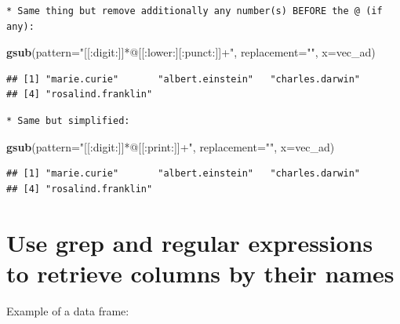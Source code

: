 \documentclass[]{book}
\newenvironment{Shaded}{\begin{snugshade}}{\end{snugshade}}
\newcommand{\DataTypeTok}[1]{\textcolor[rgb]{0.13,0.29,0.53}{#1}}
\newcommand{\KeywordTok}[1]{\textcolor[rgb]{0.13,0.29,0.53}{\textbf{#1}}}
\newcommand{\NormalTok}[1]{#1}
\newcommand{\StringTok}[1]{\textcolor[rgb]{0.31,0.60,0.02}{#1}}
\begin{document}
\begin{verbatim}
* Same thing but remove additionally any number(s) BEFORE the @ (if any):
\end{verbatim}

\begin{Shaded}
\begin{Highlighting}[]
\KeywordTok{gsub}\NormalTok{(}\DataTypeTok{pattern=}\StringTok{"[[:digit:]]*@[[:lower:][:punct:]]+"}\NormalTok{,}
        \DataTypeTok{replacement=}\StringTok{""}\NormalTok{,}
        \DataTypeTok{x=}\NormalTok{vec_ad)}
\end{Highlighting}
\end{Shaded}

\begin{verbatim}
## [1] "marie.curie"       "albert.einstein"   "charles.darwin"   
## [4] "rosalind.franklin"
\end{verbatim}

\begin{verbatim}
* Same but simplified:
\end{verbatim}

\begin{Shaded}
\begin{Highlighting}[]
\KeywordTok{gsub}\NormalTok{(}\DataTypeTok{pattern=}\StringTok{"[[:digit:]]*@[[:print:]]+"}\NormalTok{,}
        \DataTypeTok{replacement=}\StringTok{""}\NormalTok{,}
        \DataTypeTok{x=}\NormalTok{vec_ad)}
\end{Highlighting}
\end{Shaded}

\begin{verbatim}
## [1] "marie.curie"       "albert.einstein"   "charles.darwin"   
## [4] "rosalind.franklin"
\end{verbatim}

\hypertarget{use-grep-and-regular-expressions-to-retrieve-columns-by-their-names}{%
\section{Use grep and regular expressions to retrieve columns by their names}\label{use-grep-and-regular-expressions-to-retrieve-columns-by-their-names}}

Example of a data frame:
\end{document}

